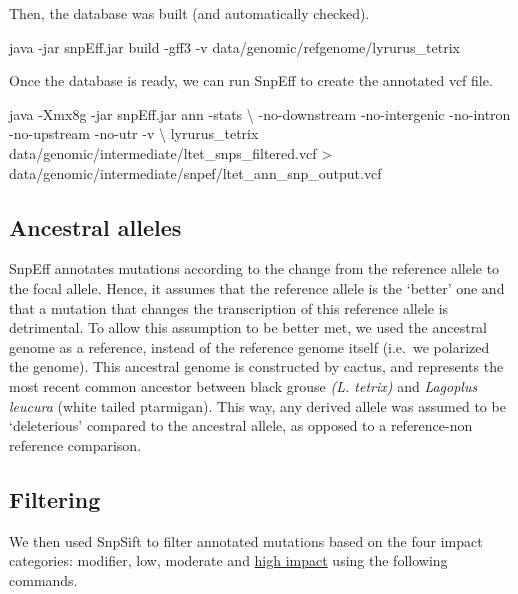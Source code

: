 \documentclass[
  letterpaper,
  DIV=11,
  numbers=noendperiod]{scrreprt}
\newenvironment{Shaded}{}{}
\newcommand{\NormalTok}[1]{\textcolor[rgb]{0.14,0.16,0.18}{#1}}
\begin{document}
Then, the database was built (and automatically checked).

\begin{Shaded}
\begin{Highlighting}[]
\NormalTok{java {-}jar snpEff.jar build {-}gff3 {-}v data/genomic/refgenome/lyrurus\_tetrix}
\end{Highlighting}
\end{Shaded}

Once the database is ready, we can run SnpEff to create the annotated
vcf file.

\begin{Shaded}
\begin{Highlighting}[]
\NormalTok{java {-}Xmx8g {-}jar snpEff.jar ann {-}stats  \textbackslash{}}
\NormalTok{{-}no{-}downstream {-}no{-}intergenic {-}no{-}intron {-}no{-}upstream {-}no{-}utr {-}v \textbackslash{}}
\NormalTok{lyrurus\_tetrix data/genomic/intermediate/ltet\_snps\_filtered.vcf \textgreater{} data/genomic/intermediate/snpef/ltet\_ann\_snp\_output.vcf}
\end{Highlighting}
\end{Shaded}

\hypertarget{ancestral-alleles}{%
\subsection{Ancestral alleles}\label{ancestral-alleles}}

SnpEff annotates mutations according to the change from the reference
allele to the focal allele. Hence, it assumes that the reference allele
is the `better' one and that a mutation that changes the transcription
of this reference allele is detrimental. To allow this assumption to be
better met, we used the ancestral genome as a reference, instead of the
reference genome itself (i.e.~we polarized the genome). This ancestral
genome is constructed by cactus, and represents the most recent common
ancestor between black grouse \emph{(L. tetrix)} and \emph{Lagoplus
leucura} (white tailed ptarmigan). This way, any derived allele was
assumed to be `deleterious' compared to the ancestral allele, as opposed
to a reference-non reference comparison.

\hypertarget{filtering}{%
\subsection{Filtering}\label{filtering}}

We then used SnpSift to filter annotated mutations based on the four
impact categories: modifier, low, moderate and
\href{https://pcingola.github.io/SnpEff/se_inputoutput/\#effect-prediction-details}{high
impact} using the following commands.
\end{document}
